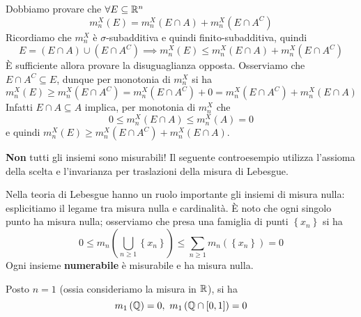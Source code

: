 \begin{demonstration}
	Dobbiamo provare che $\forall E\subseteq \mathbb{R}^n$
	\begin{equation*}
		m_n^X\left(E\right)=m_n^X\left(E\cap A\right)+m_n^X\left(E\cap A^C\right)
	\end{equation*}
	Ricordiamo che $m_n^X$ è $\sigma$-subadditiva e quindi finito-subadditiva, quindi
	\begin{equation*}
		E=\left(E\cap A\right)\cup \left(E\cap A^C\right)\implies m_n^X\left(E\right)\leq m_n^X\left(E\cap A\right)+m_n^X\left(E\cap A^C\right)
	\end{equation*}
	È sufficiente allora provare la disuguaglianza opposta. Osserviamo che $E\cap A^C\subseteq E$, dunque per monotonia di $m_n^X$ si ha
	\begin{equation*}
		m_n^X\left(E\right)\geq m_n^X\left(E\cap A^C\right)=m_n^X\left(E\cap A^C\right)+0=m_n^X\left(E\cap A^C\right)+m_n^X\left(E\cap A\right)
	\end{equation*}
	Infatti $E\cap A\subseteq A$ implica, per monotonia di $m_n^X$ che
	\begin{equation*}
		0\leq m_n^X\left(E\cap A\right)\leq m_n^X\left(A\right)=0
	\end{equation*}
	e quindi $m_n^X\left(E\right)\geq m_n^X\left(E\cap A^C\right)+m_n^X\left(E\cap A\right)$.
\end{demonstration}
\begin{attention}
	\textbf{Non} tutti gli insiemi sono misurabili! Il seguente controesempio utilizza l'assioma della scelta e l'invarianza per traslazioni della misura di Lebesgue.
\end{attention}
Nella teoria di Lebesgue hanno un ruolo importante gli insiemi di misura nulla: esplicitiamo il legame tra misura nulla e cardinalità.
È noto che ogni singolo punto ha misura nulla; osserviamo che presa una famiglia di punti $\left\{x_n\right\}$ si ha
\begin{equation*}
	0\leq m_n\left(\bigcup_{n\geq 1}\left\{x_n\right\}\right)\leq \sum_{n\geq 1}m_n\left(\left\{x_n\right\}\right)=0
\end{equation*}
Ogni insieme \textbf{numerabile} è misurabile e ha misura nulla.
\begin{example}
	Posto $n=1$ (ossia consideriamo la misura in $\mathbb{R}$), si ha
	\begin{equation*}
		m_1\left(\rationalset\right)=0,\ m_1\left(\rationalset\cap\left[0,1\right]\right)=0
	\end{equation*}
\end{example}
